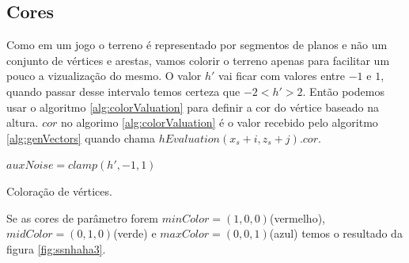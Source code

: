\subsection{Cores}
Como em um jogo o terreno é representado por segmentos de planos e não um conjunto
de vértices e arestas, vamos colorir o terreno apenas para facilitar um pouco a
vizualização do mesmo. O valor $h'$ vai ficar com valores entre $-1$ e $1$, 
quando passar desse intervalo temos certeza que $-2 < h' > 2$.
Então podemos
usar o algoritmo \ref{alg:colorValuation} para definir a cor do vértice baseado na altura.
$cor$ no algorimo \ref{alg:colorValuation} é o valor recebido pelo algoritmo \ref{alg:genVectors}
quando chama $hEvaluation(x_{s} + i, z_{s} + j).cor$.

\begin{algorithm}[H]\label{alg:colorValuation}
    $auxNoise = clamp(h', -1, 1)$\;
    
    \caption{Coloração de vértices.}
\end{algorithm}

Se as cores de parâmetro forem $minColor = (1, 0, 0)$(vermelho), $midColor = (0, 1, 0)$(verde) e $maxColor = (0, 0, 1)$(azul)
temos o resultado da figura \ref{fig:ssnhaha3}.

